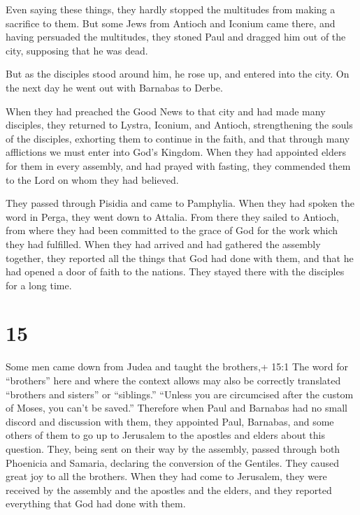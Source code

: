  Even saying these things, they hardly stopped the
multitudes from making a sacrifice to them.  But some Jews
from Antioch and Iconium came there, and having persuaded the
multitudes, they stoned Paul and dragged him out of the city, supposing
that he was dead.

 But as the disciples stood around him, he rose up, and
entered into the city. On the next day he went out with Barnabas to
Derbe.

 When they had preached the Good News to that city and had
made many disciples, they returned to Lystra, Iconium, and Antioch,
 strengthening the souls of the disciples, exhorting them
to continue in the faith, and that through many afflictions we must
enter into God's Kingdom.  When they had appointed elders
for them in every assembly, and had prayed with fasting, they commended
them to the Lord on whom they had believed.

 They passed through Pisidia and came to Pamphylia.
 When they had spoken the word in Perga, they went down to
Attalia.  From there they sailed to Antioch, from where
they had been committed to the grace of God for the work which they had
fulfilled.  When they had arrived and had gathered the
assembly together, they reported all the things that God had done with
them, and that he had opened a door of faith to the nations.
 They stayed there with the disciples for a long time.

\hypertarget{section-14}{%
\section{15}\label{section-14}}

 Some men came down from Judea and taught the brothers,+
15:1 The word for ``brothers'' here and where the context allows may
also be correctly translated ``brothers and sisters'' or ``siblings.''
``Unless you are circumcised after the custom of Moses, you can't be
saved.''  Therefore when Paul and Barnabas had no small
discord and discussion with them, they appointed Paul, Barnabas, and
some others of them to go up to Jerusalem to the apostles and elders
about this question.  They, being sent on their way by the
assembly, passed through both Phoenicia and Samaria, declaring the
conversion of the Gentiles. They caused great joy to all the brothers.
 When they had come to Jerusalem, they were received by the
assembly and the apostles and the elders, and they reported everything
that God had done with them.

